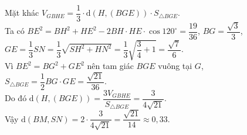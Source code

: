 \begin{ex}
{Mặt khác $V_{GBHE}=\dfrac{1}{3}\cdot \mathrm{d}\left(H,\left(BGE\right)\right)\cdot S_{\triangle BGE}$.\\
Ta có $BE^2=BH^2+HE^2-2BH\cdot HE\cdot\cos 120^{\circ}=\dfrac{19}{36}$, $BG=\dfrac{\sqrt{3}}{3}$,\\ $GE=\dfrac{1}{3} SN=\dfrac{1}{3} \sqrt{SH^2+HN^2}=\dfrac{1}{3} \sqrt{\dfrac{3}{4}+1}=\dfrac{\sqrt{7}}{6}$.\\
Vì $BE^2=BG^2+GE^2$ nên tam giác $BGE$ vuông tại $G$, $S_{\triangle BGE}=\dfrac{1}{2} BG\cdot GE=\dfrac{\sqrt{21}}{36}$.\\
Do đó $\mathrm{d}\left(H,\left(BGE\right)\right)=\dfrac{3V_{GBHE}}{S_{\triangle BGE}}=\dfrac{3}{4\sqrt{21}}$.\\
Vậy $\mathrm{d}\left(BM,SN\right)=2\cdot\dfrac{3}{4\sqrt{21}}=\dfrac{\sqrt{21}}{14} \approx 0{,}33$.
}
\end{ex}

